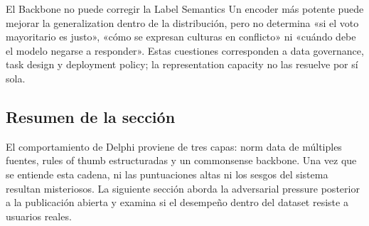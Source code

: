 
\begin{warningbox}{El Backbone no puede corregir la Label Semantics}
Un encoder más potente puede mejorar la generalization dentro de la distribución, pero no determina «si el voto mayoritario es justo», «cómo se expresan culturas en conflicto» ni «cuándo debe el modelo negarse a responder». Estas cuestiones corresponden a data governance, task design y deployment policy; la representation capacity no las resuelve por sí sola.
\end{warningbox}

\subsection{Resumen de la sección}

El comportamiento de Delphi proviene de tres capas: norm data de múltiples fuentes, rules of thumb estructuradas y un commonsense backbone. Una vez que se entiende esta cadena, ni las puntuaciones altas ni los sesgos del sistema resultan misteriosos. La siguiente sección aborda la adversarial pressure posterior a la publicación abierta y examina si el desempeño dentro del dataset resiste a usuarios reales.
